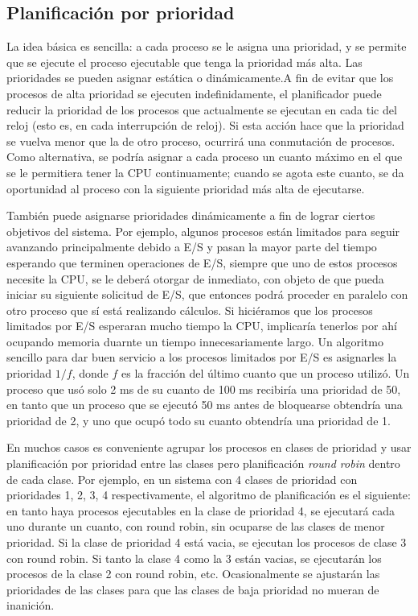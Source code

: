 \documentclass{article}
\begin{document}
\subsection{Planif\/icaci\'on por prioridad}
La idea b\'asica es sencilla: a cada proceso se le asigna una prioridad, y se permite 
que se ejecute el proceso ejecutable que tenga la prioridad m\'as alta. Las prioridades 
se pueden asignar est\'atica o din\'amicamente.A f\/in de evitar que los procesos de 
alta prioridad se ejecuten indef\/inidamente, el planif\/icador puede 
reducir la prioridad de los procesos que actualmente se ejecutan en cada tic del 
reloj (esto es, en cada interrupci\'on de reloj). Si esta acci\'on hace que la 
prioridad se vuelva menor que la de otro proceso, ocurrir\'a una conmutaci\'on de 
procesos. Como alternativa, se podr\'ia asignar a cada proceso un cuanto m\'aximo en 
el que se le permitiera tener la CPU continuamente; cuando se agota este cuanto, se da 
oportunidad al proceso con la siguiente prioridad m\'as alta de ejecutarse.

Tambi\'en puede asignarse prioridades din\'amicamente a f\/in de lograr ciertos objetivos 
del sistema. Por ejemplo, algunos procesos est\'an limitados para seguir avanzando 
principalmente debido a E/S y pasan la mayor parte del tiempo esperando que terminen 
operaciones de E/S, siempre que uno de estos procesos necesite la CPU, se le deber\'a 
otorgar de inmediato, con objeto de que pueda iniciar su siguiente solicitud de E/S, 
que entonces podr\'a proceder en paralelo con otro proceso que s\'i est\'a realizando 
c\'alculos. Si hici\'eramos que los procesos limitados por E/S esperaran mucho tiempo 
la CPU, implicar\'ia tenerlos por ah\'i ocupando memoria duarnte un tiempo 
innecesariamente largo. Un algoritmo sencillo para dar buen servicio a los procesos 
limitados por E/S es asignarles la prioridad $1/f$, donde $f$ es la fracci\'on del 
\'ultimo cuanto que un proceso utiliz\'o. Un proceso que us\'o solo 2 ms de su cuanto 
de 100 ms recibir\'ia una prioridad de 50, en tanto que un proceso que se ejecut\'o 
50 ms antes de bloquearse obtendr\'ia una prioridad de 2, y uno que ocup\'o todo su 
cuanto obtendr\'ia una prioridad de 1.

En muchos casos es conveniente agrupar los procesos en clases de prioridad y usar 
planif\/icaci\'on por prioridad entre las clases pero planif\/icaci\'on {\it round 
robin} dentro de cada clase. Por ejemplo, en un sistema con 4 clases de prioridad 
con prioridades 1, 2, 3, 4 respectivamente, el algoritmo de planif\/icaci\'on es el 
siguiente: en tanto haya procesos ejecutables en la clase de prioridad 4, se 
ejecutar\'a cada uno durante un cuanto, con round robin, sin ocuparse de las 
clases de menor prioridad. Si la clase de prioridad 4 est\'a vacia, se ejecutan 
los procesos de clase 3 con round robin. Si tanto la clase 4 como la 3 est\'an 
vacias, se ejecutar\'an los procesos de la clase 2 con round robin, etc. 
Ocasionalmente se ajustar\'an las prioridades de las clases para que las clases 
de baja prioridad no mueran de inanici\'on.
\end{document}

